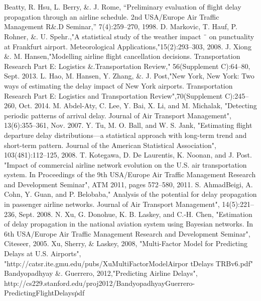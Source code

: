 \documentclass[conference]{IEEEtran}
\begin{document}
\section*{}\label{Refrences}
\begingroup 
\fontsize{8pt}{10pt}
\begin{thebibliography}{00} 
\label{[1])}Beatty, R. Hsu, L. Berry, \&. J. Rome, “Preliminary evaluation of flight delay propagation through an airline schedule. 2nd USA/Europe Air Traffic Management R\&.D Seminar,” 7(4):259–270, 1998.
\label{[2]}D. Markovic, T. Hauf, P. Rohner, \&. U. Spehr.,"A statistical study of the weather impact ¨ on punctuality at Frankfurt airport. Meteorological Applications,"15(2):293–303, 2008.
\label{[3]}J. Xiong \&.  M. Hansen,"Modelling airline flight cancellation decisions. Transportation Research Part E: Logistics \&.Transportation Review," 56(Supplement C):64–80, Sept. 2013.
\label{[4]} L. Hao, M. Hansen, Y. Zhang, \&. J. Post,"New York, New York: Two ways of estimating the delay impact of New York airports. Transportation Research Part E: Logistics and Transportation Review",70(Supplement C):245–260, Oct. 2014.
\label{[5]} M. Abdel-Aty, C. Lee, Y. Bai, X. Li, and M. Michalak, "Detecting periodic patterns of arrival delay. Journal of Air Transport Management", 13(6):355–361, Nov. 2007. 
\label{[6]}Y. Tu, M. O. Ball, and W. S. Jank, "Estimating flight departure delay distributions—a statistical approach with long-term trend and short-term pattern. Journal of the American Statistical Association", 103(481):112–125, 2008.
\label{[7]}T. Kotegawa, D. De Laurentis, K. Noonan, and J. Post. "Impact of commercial airline network evolution on the U.S. air transportation system. In Proceedings of the 9th USA/Europe Air Traffic Management Research and Development Seminar", ATM 2011, pages 572–580, 2011.
 \label{[8]}S. AhmadBeigi, A. Cohn, Y. Guan, and P. Belobaba," Analysis of the potential for delay propagation in passenger airline networks. Journal of Air Transport Management", 14(5):221–236, Sept. 2008.
 \label{[9]}N. Xu, G. Donohue, K. B. Laskey, and C.-H. Chen, "Estimation of delay propagation in the national aviation system using Bayesian networks. In 6th USA/Europe Air Traffic Management Research and Development Seminar", Citeseer, 2005. 
\label{[10]} Xu, Sherry, \& Laskey, 2008, "Multi-Factor Model for Predicting Delays at
U.S. Airports", "http://catsr.ite.gmu.edu/pubs/XuMultiFactorModelAirpor
tDelays
TRBv6.pdf"
 \label{[11]}Bandyopadhyay \&. Guerrero, 2012,"Predicting Airline Delays", http://cs229.stanford.edu/proj2012/BandyopadhyayGuerrero-PredictingFlightDelays\.pdf

\end{thebibliography}
\end{document}
